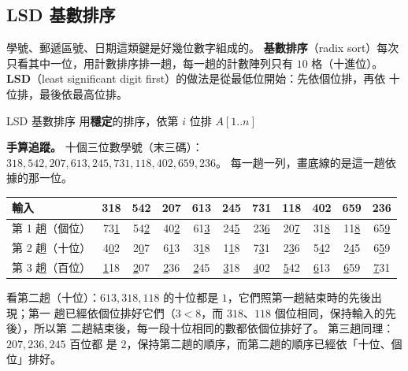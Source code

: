 \subsection{LSD 基數排序}
\label{sec:lin-lsd}

學號、郵遞區號、日期這類鍵是好幾位數字組成的。 \textbf{基數排序}（radix sort）每次
只看其中一位，用計數排序排一趟，每一趟的計數陣列只有 $10$ 格（十進位）。
\textbf{LSD}（least significant digit first）的做法是從最低位開始：先依個位排，再依
十位排，最後依最高位排。

\begin{pseudo}[label=alg:lin-radix]{LSD 基數排序}
     
        \State 用\textbf{穩定}的排序，依第 $i$ 位排 $A[1..n]$
    \EndFor
\EndProcedure
\end{pseudo}

\textbf{手算追蹤。} 十個三位數學號（末三碼）：
$318, 542, 207, 613, 245, 731, 118, 402, 659, 236$。 每一趟一列，畫底線的是這一趟依
據的那一位。

\begin{center}
\small
\setlength{\tabcolsep}{4.5pt}
\begin{tabular}{l*{10}{c}}
\toprule
輸入 & 318 & 542 & 207 & 613 & 245 & 731 & 118 & 402 & 659 & 236 \\
\midrule
第 1 趟（個位） & 73\underline{1} & 54\underline{2} & 40\underline{2} & 61\underline{3} & 24\underline{5} & 23\underline{6} & 20\underline{7} & 31\underline{8} & 11\underline{8} & 65\underline{9} \\
第 2 趟（十位） & 4\underline{0}2 & 2\underline{0}7 & 6\underline{1}3 & 3\underline{1}8 & 1\underline{1}8 & 7\underline{3}1 & 2\underline{3}6 & 5\underline{4}2 & 2\underline{4}5 & 6\underline{5}9 \\
第 3 趟（百位） & \underline{1}18 & \underline{2}07 & \underline{2}36 & \underline{2}45 & \underline{3}18 & \underline{4}02 & \underline{5}42 & \underline{6}13 & \underline{6}59 & \underline{7}31 \\
\bottomrule
\end{tabular}
\end{center}

看第二趟（十位）：$613, 318, 118$ 的十位都是 $1$，它們照第一趟結束時的先後出現；第一
趟已經依個位排好它們（$3 < 8$，而 $318$、$118$ 個位相同，保持輸入的先後），所以第
二趟結束後，每一段十位相同的數都依個位排好了。 第三趟同理：$207, 236, 245$ 百位都
是 $2$，保持第二趟的順序，而第二趟的順序已經依「十位、個位」排好。

